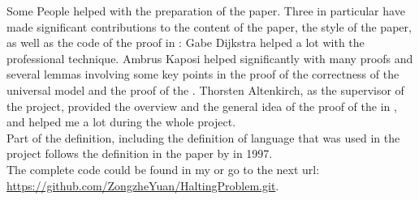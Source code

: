 \begin{acknowledgements}
Some People helped with the preparation of the paper. 
Three in particular have made significant contributions to the content of the paper, the style of the paper, as well as the code of the proof in :
Gabe Dijkstra helped a lot with the professional \Agda technique.
Ambrus Kaposi helped significantly with many proofs and several lemmas involving some key points in the proof of the correctness of the universal model and the proof of the .
Thorsten Altenkirch, as the supervisor of the project, provided the overview and the general idea of the proof of the  in , and helped me a lot during the whole project.\\
Part of the definition, including the definition of \WHILE language that was used in the project follows the definition in the paper  by  in 1997\cite{jones_computability_1997}.\\
The complete code could be found in my \href{https://github.com/ZongzheYuan/HaltingProblem.git}{} or go to the next url: \url{https://github.com/ZongzheYuan/HaltingProblem.git}.
\end{acknowledgements}